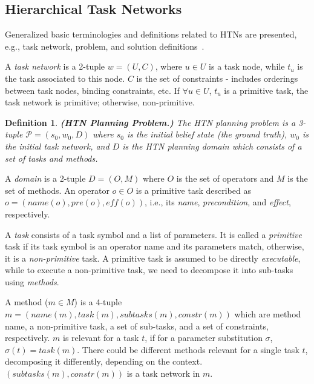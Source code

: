 \documentclass[letterpaper]{article} %
\newtheorem{definition}{Definition}
\begin{document}

\subsection{Hierarchical Task Networks}
Generalized basic terminologies and definitions related to HTNs are presented, e.g., task network, problem, and solution definitions~\cite{naubooks0014222}.  

A \textit{task network} is a 2-tuple $w=(U,C)$, where $u\in U$ is a task node, while $t_u$ is the task associated to this node. $C$ is the set of constraints - includes orderings between task nodes, binding constraints, etc. If $\forall u \in U$, $t_u$ is a primitive task, the task network is primitive; otherwise, non-primitive.

\begin{definition}
\textbf{(HTN Planning Problem.)} 
The HTN planning
problem is a 3-tuple $\mathcal{P} = (s_0, w_0, D)$ where $s_0$ is the initial belief state (the ground truth), $w_0$ is the initial task network, and $D$ is the HTN planning domain which consists of a set of tasks and methods.
\end{definition}
A \textit{domain} is a 2-tuple $D=(O, M)$ where $O$ is the set of operators and $M$ is the set of methods. 
An operator $o \in O$ is a primitive task described as $o=(name(o), pre(o), \textit{eff}(o))$, i.e., its \textit{name}, \textit{precondition}, and \textit{effect}, respectively. 

A \textit{task} consists of a task symbol and a list of parameters. It is called a \textit{primitive} task if its task symbol is an operator name and its parameters match, otherwise, it is a \textit{non-primitive} task. A primitive task is assumed to be directly \textit{executable}, while to execute a non-primitive task, we need to decompose it into sub-tasks using \textit{methods}. 

A method ($m \in M$) is a 4-tuple $m=(name(m),task(m),subtasks(m),constr(m))$ which are method name, a non-primitive task, a set of sub-tasks, and a set of constraints, respectively. $m$ is relevant for a task $t$, if for a parameter substitution $\sigma$, $\sigma(t) = task(m)$. There could be different methods relevant for a single task $t$, decomposing it differently, depending on the context. $(subtasks(m),constr(m))$ is a task network in $m$.      
\end{document}
